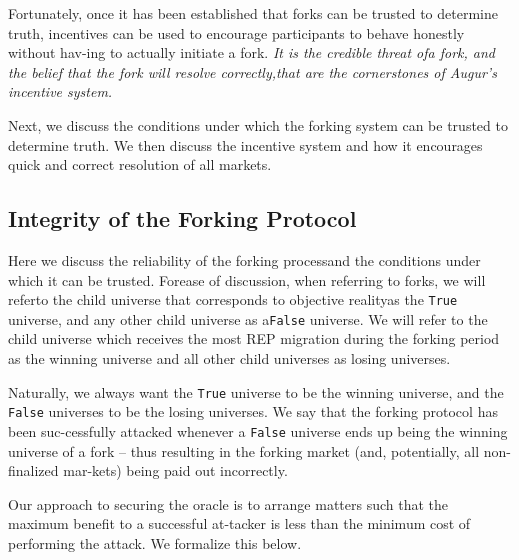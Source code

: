 \documentclass[12pt,floatfix,reprint,nofootinbib,amsmath,amssymb,epsfig,pre,floats,letterpaper,groupedaffiliation]{revtex4-1}
\theoremstyle{definition}
\theoremstyle{definition}
\begin{document}
Fortunately, once it has been established that forks can be trusted to determine truth, incentives can be used to encourage participants to behave honestly without hav-\linebreak ing to actually initiate a fork. \textit{It is the credible threat of\linebreak a fork, and the belief that the fork will resolve correctly,\linebreak that are the cornerstones of Augur's incentive system.}

Next, we discuss the conditions under which the fork\-ing system can be trusted to determine truth. We then discuss the incentive system and how it encourages quick and correct resolution of all markets.

\subsection{Integrity of the Forking Protocol}\label{section:integrity_forking_protocol}

Here we discuss the reliability of the forking process\linebreak and the conditions under which it can be trusted. For\pagebreak\linebreak  ease of discussion, when referring to forks, we will refer\linebreak to the child universe that corresponds to objective reality\linebreak as the \texttt{True} universe, and any other child universe as a\linebreak \texttt{False} universe. We will refer to the child universe which receives the most REP migration during the forking pe\-riod as the winning universe and all other child universes as losing universes.

Naturally, we always want the \texttt{True} universe to be the winning universe, and the \texttt{False} universes to be the losing universes. We say that the forking protocol has been suc-\linebreak cessfully attacked whenever a \texttt{False} universe ends up be\-ing the winning universe of a fork -- thus resulting in the forking market (and, potentially, all non-finalized mar-\linebreak kets) being paid out incorrectly.

Our approach to securing the oracle is to arrange mat\-ters such that the maximum benefit to a successful at-\linebreak tacker is less than the minimum cost of performing the attack. We formalize this below.
\end{document}
